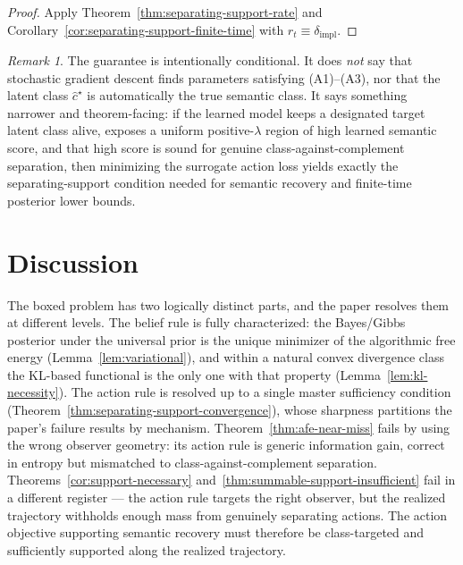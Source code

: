 \documentclass[11pt]{article}
\theoremstyle{definition}
\theoremstyle{remark}
\newtheorem{remark}[theorem]{Remark}
\begin{document}
\begin{proof}
Apply Theorem~\ref{thm:separating-support-rate} and Corollary~\ref{cor:separating-support-finite-time} with $r_t\equiv \delta_{\mathrm{impl}}$.
\end{proof}

\begin{remark}
\label{rem:amortized-surrogate-scope}
The guarantee is intentionally conditional. It does \emph{not} say that stochastic gradient descent finds parameters satisfying \textup{(A1)--(A3)}, nor that the latent class $\hat c^\star$ is automatically the true semantic class. It says something narrower and theorem-facing: if the learned model keeps a designated target latent class alive, exposes a uniform positive-$\lambda$ region of high learned semantic score, and that high score is sound for genuine class-against-complement separation, then minimizing the surrogate action loss yields exactly the separating-support condition needed for semantic recovery and finite-time posterior lower bounds.
\end{remark}

\section{Discussion}
\label{sec:discussion}

The boxed problem has two logically distinct parts, and the paper resolves them at different levels. The belief rule is fully characterized: the Bayes/Gibbs posterior under the universal prior is the unique minimizer of the algorithmic free energy (Lemma~\ref{lem:variational}), and within a natural convex divergence class the KL-based functional is the only one with that property (Lemma~\ref{lem:kl-necessity}). The action rule is resolved up to a single master sufficiency condition (Theorem~\ref{thm:separating-support-convergence}), whose sharpness partitions the paper's failure results by mechanism. Theorem~\ref{thm:afe-near-miss} fails by using the wrong observer geometry: its action rule is generic information gain, correct in entropy but mismatched to class-against-complement separation. Theorems~\ref{cor:support-necessary} and~\ref{thm:summable-support-insufficient} fail in a different register --- the action rule targets the right observer, but the realized trajectory withholds enough mass from genuinely separating actions. The action objective supporting semantic recovery must therefore be class-targeted and sufficiently supported along the realized trajectory.
\end{document}
